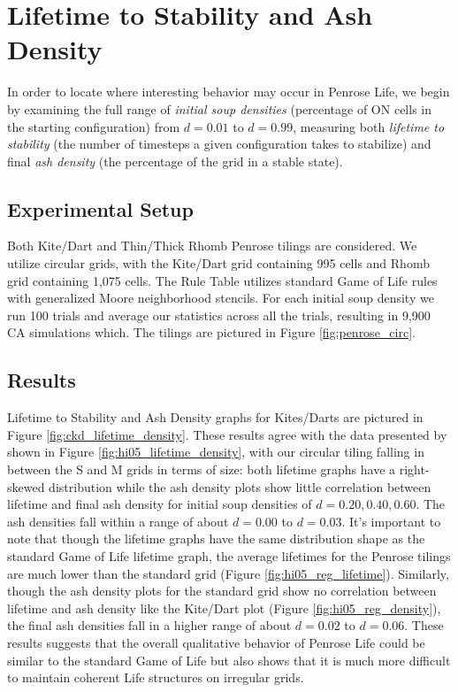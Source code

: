 \documentclass[a4paper,11pt]{report}
\begin{document}
\section{Lifetime to Stability and Ash Density}

In order to locate where interesting behavior may occur in Penrose Life, we begin by examining the full range of \textit{initial soup densities} (percentage of ON cells in the starting configuration) from $d=0.01$ to $d=0.99$, measuring both \textit{lifetime to stability} (the number of timesteps a given configuration takes to stabilize) and final \textit{ash density} (the percentage of the grid in a stable state).

\subsection*{Experimental Setup}
Both Kite/Dart and Thin/Thick Rhomb Penrose tilings are considered. We utilize circular grids, with the Kite/Dart grid containing 995 cells and Rhomb grid containing 1,075 cells. The Rule Table utilizes standard Game of Life rules with generalized Moore neighborhood stencils. For each initial soup density we run 100 trials and average our statistics across all the trials, resulting in 9,900 CA simulations which. The tilings are pictured in Figure \ref{fig:penrose_circ}.

\subsection*{Results}
Lifetime to Stability and Ash Density graphs for Kites/Darts are pictured in Figure \ref{fig:ckd_lifetime_density}. These results agree with the data presented by \citeauthor{hi05} shown in Figure \ref{fig:hi05_lifetime_density}, with our circular tiling falling in between the S and M grids in terms of size: both lifetime graphs have a right-skewed distribution while the ash density plots show little correlation between lifetime and final ash density for initial soup densities of $d=0.20, 0.40, 0.60$. The ash densities fall within a range of about $d=0.00$ to $d=0.03$. It's important to note that though the lifetime graphs have the same distribution shape as the standard Game of Life lifetime graph, the average lifetimes for the Penrose tilings are much lower than the standard grid (Figure \ref{fig:hi05_reg_lifetime}). Similarly, though the ash density plots for the standard grid show no correlation between lifetime and ash density like the Kite/Dart plot (Figure \ref{fig:hi05_reg_density}), the final ash densities fall in a higher range of about $d=0.02$ to $d=0.06$. These results suggests that the overall qualitative behavior of Penrose Life could be similar to the standard Game of Life but also shows that it is much more difficult to maintain coherent Life structures on irregular grids.
\end{document}
